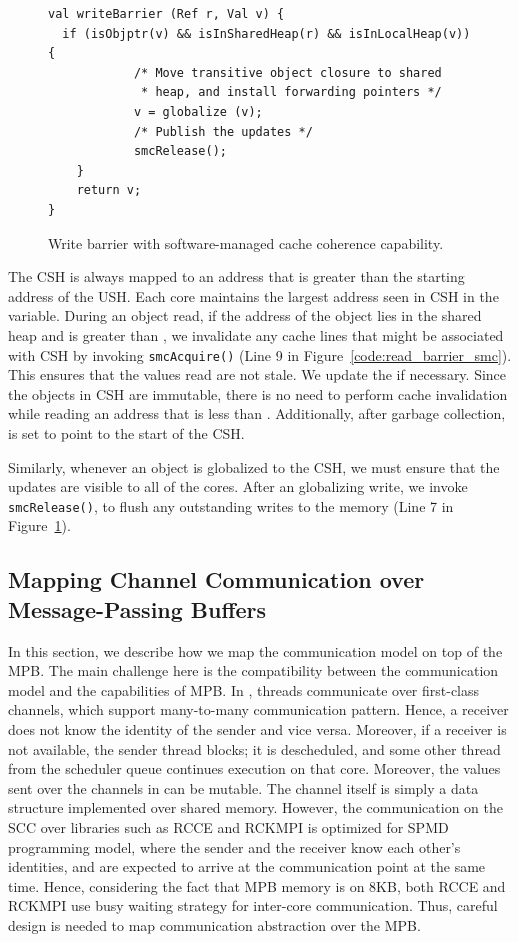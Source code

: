 \begin{figure}[t]
\begin{lstlisting}
val writeBarrier (Ref r, Val v) {
  if (isObjptr(v) && isInSharedHeap(r) && isInLocalHeap(v)) {
			/* Move transitive object closure to shared
			 * heap, and install forwarding pointers */
			v = globalize (v);
			/* Publish the updates */
			smcRelease();
	}
	return v;
}
\end{lstlisting}
\caption{Write barrier with software-managed cache coherence capability.}
\label{code:write_barrier_smc}
\end{figure}


The CSH is always mapped to an address that is greater than the starting
address of the USH. Each core maintains the largest address seen in CSH in the
 variable. During an object read, if the address of the
object lies in the shared heap and is greater than , we
invalidate any cache lines that might be associated with CSH by invoking
\texttt{smcAcquire()} (Line 9 in Figure~\ref{code:read_barrier_smc}). This
ensures that the values read are not stale. We update the 
if necessary. Since the objects in CSH are immutable, there is no need to
perform cache invalidation while reading an address that is less than
. Additionally, after garbage collection,
 is set to point to the start of the CSH.

Similarly, whenever an object is globalized to the CSH, we must ensure that the
updates are visible to all of the cores. After an globalizing write, we invoke
\texttt{smcRelease()}, to flush any outstanding writes to the memory (Line 7 in
Figure~\ref{code:write_barrier_smc}).

\subsection{Mapping Channel Communication over Message-Passing Buffers}
\label{sec:comm_opt}

In this section, we describe how we map the \MM communication model on top of
the MPB. The main challenge here is the compatibility between the \MM
communication model and the capabilities of MPB. In \MM, threads communicate
over first-class channels, which support many-to-many communication pattern.
Hence, a receiver does not know the identity of the sender and vice versa.
Moreover, if a receiver is not available, the sender thread blocks; it is
descheduled, and some other thread from the scheduler queue continues execution
on that core. Moreover, the values sent over the channels in \MM can be
mutable. The channel itself is simply a data structure implemented over shared
memory. However, the communication on the SCC over libraries such as RCCE and
RCKMPI is optimized for SPMD programming model, where the sender and the
receiver know each other's identities, and are expected to arrive at the
communication point at the same time. Hence, considering the fact that MPB
memory is on 8KB, both RCCE and RCKMPI use busy waiting strategy for inter-core
communication. Thus, careful design is needed to map \MM communication
abstraction over the MPB.

